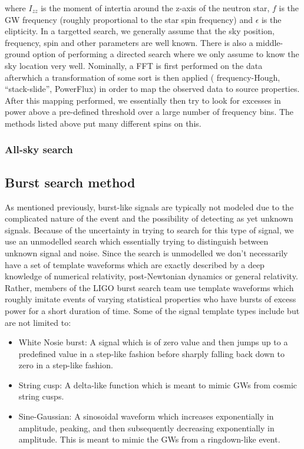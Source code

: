 where $I_{zz}$ is the moment of intertia around the z-axis of the 
neutron star, $f$ is the \ac{GW} frequency (roughly proportional to 
the star spin frequency) and $\epsilon$ is the elipticity. In a targetted 
search, we generally assume that the sky position, frequency, spin and 
other parameters are well known. There is also a middle-ground option of 
performing a directed search where we only assume to know the sky location 
very well. Nominally, a \ac{FFT} is first performed on the 
data afterwhich a transformation of some sort is then applied (
frequency-Hough, ``stack-slide'', PowerFlux) in order to 
map the observed data to source properties. After this mapping performed, 
we essentially then try to look for excesses in power above 
a pre-defined threshold over a large number of frequency bins. The 
methods listed above put many different spins on this\cite{PhysRevD.90.042002}.

\subsubsection{All-sky search}

\subsection{Burst search method}

As mentioned previously, burst-like signals are typically not modeled due to the complicated nature of the event and the possibility of detecting as yet unknown signals. Because of the uncertainty in trying to search for this type of signal, we use an unmodelled search which essentially trying to distinguish between unknown signal and noise. Since the search is unmodelled we don't necessarily have a set of template waveforms which are exactly described by a deep knowledge of numerical relativity, post-Newtonian dynamics or general relativity. Rather, members of the \ac{LIGO} burst search team use template waveforms which roughly imitate events of varying statistical properties who have bursts of excess power for a short duration of time. Some of the signal template types include but are not limited to:

\begin{itemize}
    \item White Nosie burst: A signal which is of zero value and then jumps up to a predefined value in a step-like fashion before sharply falling back down to zero in a step-like fashion.
    \item String cusp: A delta-like function which is meant to mimic \ac{GW}s from cosmic string cusps.
    \item Sine-Gaussian: A sinosoidal waveform which increases exponentially in amplitude, peaking, and then subsequently decreasing exponentially in amplitude. This is meant to mimic the \ac{GW}s from a ringdown-like event.
\end{itemize}

